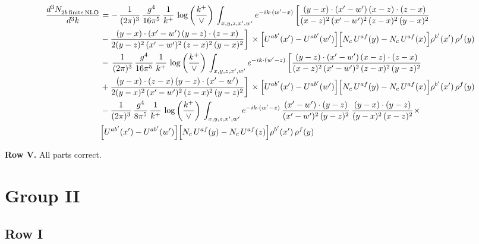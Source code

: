 \documentclass[9pt]{article}
\newcommand{\new}[1]{{\color{blue}#1}}
\numberwithin{equation}{section}
\begin{document}
\begin{align}
    \frac{d^{3}N_{2b\,\rm finite\, NLO}^{\rm}}{d^{3}k} & =    -\, \frac{1}{(2\pi)^{3}}\,\frac{g^{4}}{16\pi^{5}}\,\frac{1}{k^{+}}\, \log{\left(\frac{k^{+}}{\vee}\right)}\,\int_{x,y,z,x',w'}e^{-ik\cdot(w'-x)}\, \bigg[\frac{(y-x)\cdot (x'-w')\,(x-z)\cdot (z-x)}{(x-z)^{2}\,(x'-w')^{2}\,(z-x)^{2}\,(y-x)^{2}}\notag \\ & -\frac{(y-x)\cdot (x'-w')\,(y-z)\cdot (z-x)}{2(y-z)^{2}\,(x'-w')^{2}\,(z-x)^{2}\,(y-x)^{2}}\bigg]\,\times \Big[U^{ab'}(x')-U^{ab'}(w')\Big]\Big[N_{c}\,U^{af}(y)-N_{c}\,U^{af}(x)\Big]\rho^{b'}(x')\,\rho^{f}(y)\notag \\ & -\, \frac{1}{(2\pi)^{3}}\,\frac{g^{4}}{16\pi^{5}}\,\frac{1}{k^{+}}\,\log{\left(\frac{k^{+}}{\vee}\right)}\,\int_{x,y,z,x',w'}e^{-ik\cdot(w'-z)}\,\bigg[\frac{(y-z)\cdot (x'-w')\,(x-z)\cdot (z-x)}{(x-z)^{2}\,(x'-w')^{2}\,(z-x)^{2}\,(y-z)^{2}}\notag \\ & +\frac{(y-x)\cdot (z-x)\,(y-z)\cdot (x'-w')}{2(y-x)^{2}\,(x'-w')^{2}\,(z-x)^{2}\,(y-z)^{2}}\bigg]\,\times \Big[U^{ab'}(x')-U^{ab'}(w')\Big]\Big[N_{c}\,U^{af}(y)-N_{c}\,U^{af}(x)\Big]\rho^{b'}(x')\,\rho^{f}(y)\notag \\ & - \frac{1}{(2\pi)^{3}}\,\frac{g^{4}}{8\pi^{5}}\,\frac{1}{k^{+}}\,\log{\left(\frac{k^{+}}{\vee}\right)}\,\int_{x,y,z,x',w'}e^{-ik\cdot(w'-z)}\,\frac{(x'-w')\cdot(y-z)}{(x'-w')^{2}\,(y-z)^{2}}\,\frac{(y-x)\cdot(y-z)}{(y-x)^{2}\,(x-z)^{2}}\times\notag \\ & \Big[U^{ab'}(x')-U^{ab'}(w')\Big]\Big[N_{c}\,U^{af}(y)-N_{c}\,U^{af}(z)\Big]\rho^{b'}(x')\,\rho^{f}(y)
\end{align}

\new{\textbf{Row V.} All parts correct.}
\section{Group II}
\subsection{Row I}
\end{document}
